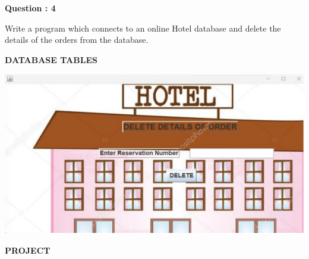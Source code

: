 \documentclass[a4paper,12pt]{report}
\begin{document}
\begin{flushleft}
	\textbf{Question : 4}
\end{flushleft}

Write a program which connects to an online Hotel database and delete the details of the
orders from the database.

\begin{flushleft}
	\textbf{DATABASE TABLES}
\end{flushleft}
\includegraphics[scale=0.7]{hotel.png}

\newpage
\begin{center}
	\large\textbf{PROJECT}
\end{center}
\end{document}
